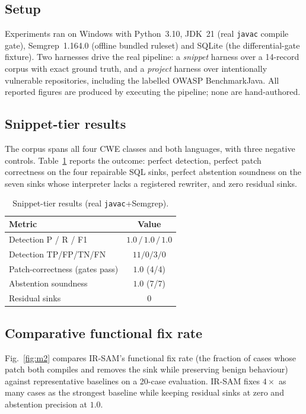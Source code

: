 \documentclass[conference]{IEEEtran}
\newcommand{\irsam}{IR-SAM}
\newcommand{\code}[1]{\texttt{\small #1}}
\begin{document}
\subsection{Setup}
Experiments ran on Windows with Python~3.10, JDK~21 (real \code{javac}
compile gate), Semgrep~1.164.0 (offline bundled ruleset) and SQLite (the
differential-gate fixture). Two harnesses drive the real pipeline: a
\emph{snippet} harness over a 14-record corpus with exact ground truth,
and a \emph{project} harness over intentionally vulnerable repositories,
including the labelled OWASP BenchmarkJava. All reported figures are
produced by executing the pipeline; none are hand-authored.

\subsection{Snippet-tier results}
The corpus spans all four CWE classes and both languages, with three
negative controls. Table~\ref{tab:snippet} reports the outcome: perfect
detection, perfect patch correctness on the four repairable SQL sinks,
perfect abstention soundness on the seven sinks whose interpreter lacks a
registered rewriter, and zero residual sinks.

\begin{table}[t]
\centering
\caption{Snippet-tier results (real \code{javac}+Semgrep).}
\label{tab:snippet}
\begin{tabular}{@{}lc@{}}
\toprule
\textbf{Metric} & \textbf{Value} \\
\midrule
Detection P / R / F1            & $1.0\,/\,1.0\,/\,1.0$ \\
Detection TP/FP/TN/FN           & $11/0/3/0$ \\
Patch-correctness (gates pass)  & $1.0$ (4/4) \\
Abstention soundness            & $1.0$ (7/7) \\
Residual sinks                  & $0$ \\
\bottomrule
\end{tabular}
\end{table}

\subsection{Comparative functional fix rate}
Fig.~\ref{fig:m2} compares \irsam{}'s functional fix rate (the fraction of
cases whose patch both compiles and removes the sink while preserving
benign behaviour) against representative baselines on a 20-case
evaluation. \irsam{} fixes $4\times$ as many cases as the strongest
baseline while keeping residual sinks at zero and abstention precision at
$1.0$.
\end{document}
